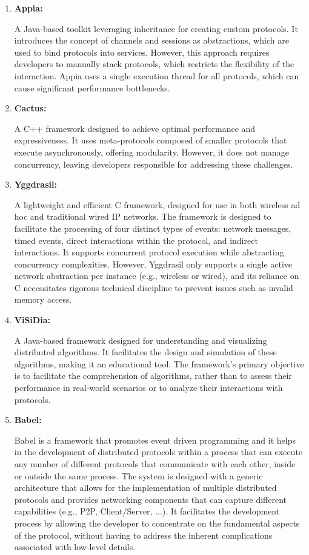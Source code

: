 \begin{enumerate}
	\item \textbf{Appia:}
	
	A Java-based toolkit leveraging inheritance for creating custom protocols. It introduces the concept of channels and sessions as abstractions, which are used to bind protocols into services. 
	However, this approach requires developers to manually stack protocols, which restricts the flexibility of the interaction. Appia uses a single execution thread for all protocols, which can cause significant performance bottlenecks.
	
	\item \textbf{Cactus:}

	A C++ framework designed to achieve optimal performance and expressiveness. It uses meta-protocols composed of smaller protocols that execute asynchronously, offering modularity.
	However, it does not manage concurrency, leaving developers responsible for addressing these challenges.
	
	\item \textbf{Yggdrasil:}
	
	A lightweight and efficient C framework, designed for use in both wireless ad hoc and traditional wired IP networks. The framework is designed to facilitate the processing of four distinct types of events: network messages, timed events, direct interactions within the protocol, and indirect interactions. It supports concurrent protocol execution while abstracting concurrency complexities.
	However, Yggdrasil only supports a single active network abstraction per instance (e.g., wireless or wired), and its reliance on C necessitates rigorous technical discipline to prevent issues such as invalid memory access.
	
	\item \textbf{ViSiDia:}
	
	A Java-based framework designed for understanding and visualizing distributed algorithms. It facilitates the design and simulation of these algorithms, making it an educational tool. The framework's primary objective is to facilitate the comprehension of algorithms, rather than to assess their performance in real-world scenarios or to analyze their interactions with protocols.
	
	\item \textbf{Babel:}
	 
	Babel is a framework that promotes event driven programming and it helps in the development of distributed protocols within a process that can execute any number of different protocols that communicate with each other, inside or outside the same process. The system is designed with a generic architecture that allows for the implementation of multiple distributed protocols and provides networking components that can capture different capabilities (e.g., \gls{P2P}, Client/Server, ...). 
	It facilitates the development process by allowing the developer to concentrate on the fundamental aspects of the protocol, without having to address the inherent complications associated with low-level details.
	
\end{enumerate}

